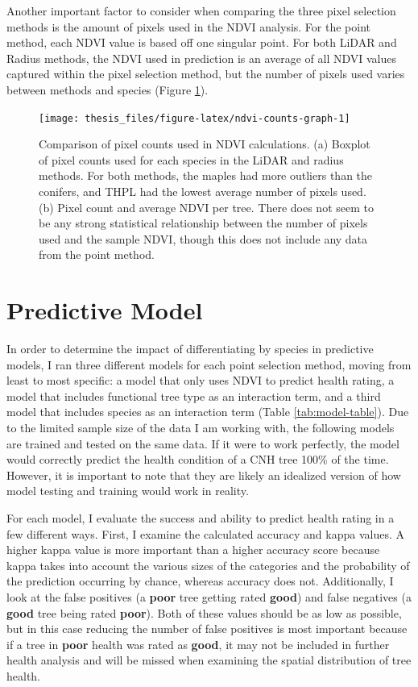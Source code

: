\documentclass[12pt,twoside]{reedthesis}
\begin{document}
Another important factor to consider when comparing the three pixel selection methods is the amount of pixels used in the NDVI analysis. For the point method, each NDVI value is based off one singular point. For both LiDAR and Radius methods, the NDVI used in prediction is an average of all NDVI values captured within the pixel selection method, but the number of pixels used varies between methods and species (Figure \ref{fig:ndvi-counts-graph}).
\begin{figure}

{\centering \texttt{[image: thesis\_files/figure-latex/ndvi-counts-graph-1]} 

}

\caption[Pixel counts for NDVI calculation, by method, and for sample NDVI.]{Comparison of pixel counts used in NDVI calculations. (a) Boxplot of pixel counts used for each species in the LiDAR and radius methods. For both methods, the maples had more outliers than the conifers, and THPL had the lowest average number of pixels used. (b) Pixel count and average NDVI per tree. There does not seem to be any strong statistical relationship between the number of pixels used and the sample NDVI, though this does not include any data from the point method.}\label{fig:ndvi-counts-graph}
\end{figure}
\hypertarget{predictive-model}{%
\section{Predictive Model}\label{predictive-model}}

In order to determine the impact of differentiating by species in predictive models, I ran three different models for each point selection method, moving from least to most specific: a model that only uses NDVI to predict health rating, a model that includes functional tree type as an interaction term, and a third model that includes species as an interaction term (Table \ref{tab:model-table}). Due to the limited sample size of the data I am working with, the following models are trained and tested on the same data. If it were to work perfectly, the model would correctly predict the health condition of a CNH tree 100\% of the time.
However, it is important to note that they are likely an idealized version of how model testing and training would work in reality.

For each model, I evaluate the success and ability to predict health rating in a few different ways. First, I examine the calculated accuracy and kappa values. A higher kappa value is more important than a higher accuracy score because kappa takes into account the various sizes of the categories and the probability of the prediction occurring by chance, whereas accuracy does not. Additionally, I look at the false positives (a \textbf{poor} tree getting rated \textbf{good}) and false negatives (a \textbf{good} tree being rated \textbf{poor}). Both of these values should be as low as possible, but in this case reducing the number of false positives is most important because if a tree in \textbf{poor} health was rated as \textbf{good}, it may not be included in further health analysis and will be missed when examining the spatial distribution of tree health.
\end{document}
